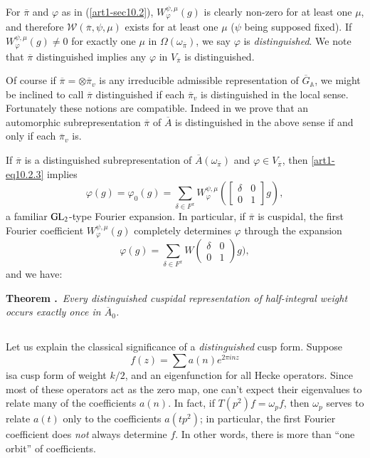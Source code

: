 For $\overline{\pi}$ and $\varphi$ as in (\ref{art1-sec10.2}), $W^{\psi,\mu}_{\varphi}(g)$ is clearly non-zero for at least one $\mu$, and therefore $\mathscr{W}(\overline{\pi},\psi,\mu)$ exists for at least one $\mu$ ($\psi$ being supposed fixed). If $W^{\psi,\mu}_{\varphi}(g)\neq 0$ for exactly one $\mu$ in $\Omega(\omega_{\overline{\pi}})$, we say $\varphi$ is {\em distinguished}. We note that $\overline{\pi}$ distinguished implies any $\varphi$ in $V_{\overline{\pi}}$ is distinguished.

Of course if $\overline{\pi}=\otimes \overline{\pi}_{v}$ is any irreducible admissible representation of $\overline{G}_{\mathbb{A}}$, we might be inclined to call $\overline{\pi}$ distinguished if each $\overline{\pi}_{v}$ is distinguished in the local sense. Fortunately these notions are compatible. Indeed in \cite{GePS 2} we prove that an automorphic subrepresentation $\overline{\pi}$ of $\overline{A}$ is distinguished in the above sense if and only if each $\overline{\pi}_{v}$ is.

If $\overline{\pi}$ is a distinguished subrepresentation of $\overline{A}(\omega_{\overline{\pi}})$ and $\varphi\in V_{\overline{\pi}}$, then \eqref{art1-eq10.2.3} implies
\setcounter{equation}{0}
\begin{equation}
\varphi(g)=\varphi_{0}(g)=\sum\limits_{\delta\in F^{x}}W^{\psi,\mu}_{\varphi}\left(\begin{bmatrix} \delta & 0\\ 0 & 1\end{bmatrix}g\right),\label{art1-eq10.3.1}
\end{equation}
a familiar $\mathrm{GL}_{2}$-type Fourier expansion. In particular, if $\overline{\pi}$ is cuspidal, the first Fourier coefficient $W^{\psi,\mu}_{\varphi}(g)$ completely determines $\varphi$ through the expansion
$$
\varphi(g)=\sum\limits_{\delta\in F^{x}}W\left(\begin{matrix} \delta & 0\\ 0 & 1\end{matrix}\right)g),
$$
and we have:

\medskip
\noindent
{\bf Theorem .\label{art1-thm10.3.2}}~{\em Every distinguished cuspidal representation of half-integral weight occurs exactly once in $\overline{A}_{0}$.}
\smallskip

\subsection{}\label{art1-sec10.4}
Let us explain the classical significance of a {\em distinguished} cusp form. Suppose
$$
f(z)=\sum a(n)e^{2\pi inz}
$$
is\pageoriginale a cusp form of weight $k/2$, and an eigenfunction for all Hecke operators. Since most of these operators act as the zero map, one can't expect their eigenvalues to relate many of the coefficients $a(n)$. In fact, if $T(p^{2})f=\omega_{p}f$, then $\omega_{p}$ serves to relate $a(t)$ only to the coefficients $a(tp^{2})$; in particular, the first Fourier coefficient does {\em not} always determine $f$. In other words, there is more than ``one orbit'' of coefficients.


